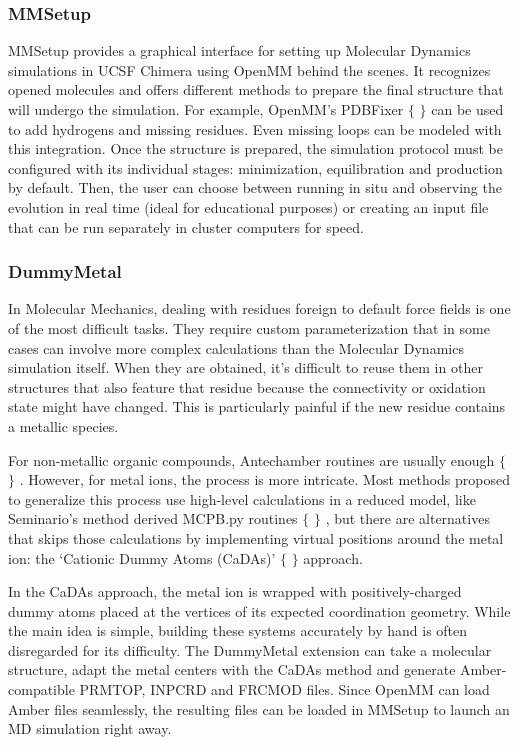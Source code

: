 \subsubsection{MMSetup}
MMSetup provides a graphical interface for setting up Molecular Dynamics simulations in UCSF Chimera using OpenMM behind the scenes. It recognizes opened molecules and offers different methods to prepare the final structure that will undergo the simulation. For example, OpenMM’s PDBFixer $ \{ $ $ \} $  can be used to add hydrogens and missing residues. Even missing loops can be modeled with this integration. Once the structure is prepared, the simulation protocol must be configured with its individual stages: minimization, equilibration and production by default. Then, the user can choose between running in situ and observing the evolution in real time (ideal for educational purposes) or creating an input file that can be run separately in cluster computers for speed.

\subsubsection{DummyMetal}
In Molecular Mechanics, dealing with residues foreign to default force fields is one of the most difficult tasks. They require custom parameterization that in some cases can involve more complex calculations than the Molecular Dynamics simulation itself. When they are obtained, it’s difficult to reuse them in other structures that also feature that residue because the connectivity or oxidation state might have changed. This is particularly painful if the new residue contains a metallic species.

For non-metallic organic compounds, Antechamber routines are usually enough $ \{ $ $ \} $ . However, for metal ions, the process is more intricate. Most methods proposed to generalize this process use high-level calculations in a reduced model, like Seminario’s method derived MCPB.py routines $ \{ $ $ \} $ , but there are alternatives that skips those calculations by implementing virtual positions around the metal ion: the ‘Cationic Dummy Atoms (CaDAs)’ $ \{ $ $ \} $  approach.

In the CaDAs approach, the metal ion is wrapped with positively-charged dummy atoms placed at the vertices of its expected coordination geometry. While the main idea is simple, building these systems accurately by hand is often disregarded for its difficulty. The DummyMetal extension can take a molecular structure, adapt the metal centers with the CaDAs method and generate Amber-compatible PRMTOP, INPCRD and FRCMOD files. Since OpenMM can load Amber files seamlessly, the resulting files can be loaded in MMSetup to launch an MD simulation right away.

